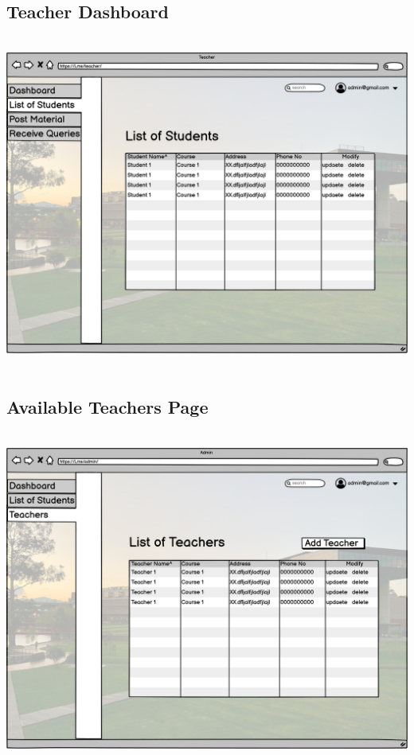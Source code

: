 \subsection{Teacher Dashboard}

\includegraphics[width=18cm, height=11cm]{HW_1/images/List of Students teacher.png}

\subsection{Available Teachers Page}

\includegraphics[width=18cm, height=11cm]{HW_1/images/Teachers.png}

